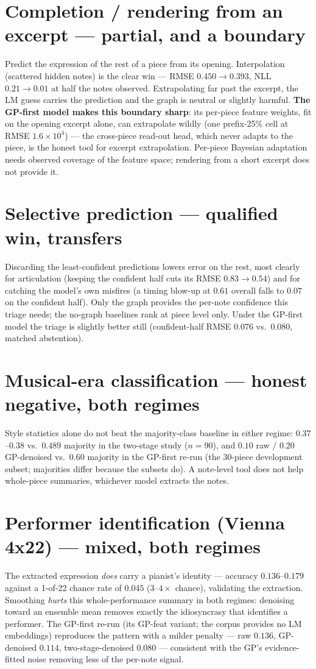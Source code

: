 \documentclass[11pt,a4paper]{report}
\begin{document}
\section{Completion / rendering from an excerpt --- partial, and a boundary}
Predict the expression of the rest of a piece from its opening. Interpolation
(scattered hidden notes) is the clear win --- RMSE $0.450 \to 0.393$, NLL
$0.21 \to 0.01$ at half the notes observed. Extrapolating far past the excerpt, the
LM guess carries the prediction and the graph is neutral or slightly harmful.
\textbf{The GP-first model makes this boundary sharp}: its per-piece feature
weights, fit on the opening excerpt alone, can extrapolate wildly (one prefix-25\%
cell at RMSE $1.6\times 10^4$) --- the cross-piece read-out head, which never
adapts to the piece, is the honest tool for excerpt extrapolation. Per-piece
Bayesian adaptation needs observed coverage of the feature space; rendering from a
short excerpt does not provide it.

\section{Selective prediction --- qualified win, transfers}
Discarding the least-confident predictions lowers error on the rest, most clearly
for articulation (keeping the confident half cuts its RMSE $0.83 \to 0.54$) and for
catching the model's own misfires (a timing blow-up at $0.61$ overall falls to
$0.07$ on the confident half). Only the graph provides the per-note confidence this
triage needs; the no-graph baselines rank at piece level only. Under the GP-first
model the triage is slightly better still (confident-half RMSE $0.076$ vs.\
$0.080$, matched abstention).

\section{Musical-era classification --- honest negative, both regimes}
Style statistics alone do not beat the majority-class baseline in either regime:
$0.37$--$0.38$ vs.\ $0.489$ majority in the two-stage study ($n{=}90$), and
$0.10$ raw / $0.20$ GP-denoised vs.\ $0.60$ majority in the GP-first re-run
(the 30-piece development subset; majorities differ because the subsets do). A note-level tool does not help whole-piece
summaries, whichever model extracts the notes.

\section{Performer identification (Vienna 4x22) --- mixed, both regimes}
The extracted expression \emph{does} carry a pianist's identity --- accuracy
$0.136$--$0.179$ against a 1-of-22 chance rate of $0.045$ ($3$--$4\times$ chance),
validating the extraction. Smoothing \emph{hurts} this whole-performance summary in
both regimes: denoising toward an ensemble mean removes exactly the idiosyncrasy
that identifies a performer. The GP-first re-run (its GP-feat variant; the corpus
provides no LM embeddings) reproduces the pattern with a milder penalty --- raw
$0.136$, GP-denoised $0.114$, two-stage-denoised $0.080$ --- consistent with the
GP's evidence-fitted noise removing less of the per-note signal.
\end{document}
